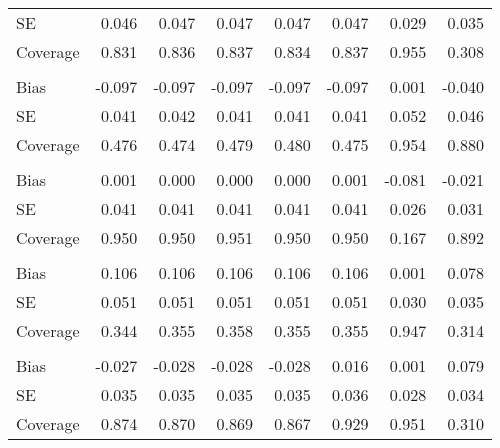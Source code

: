 \begin{table}
\begin{tabular}{lddddddd}
\hspace{1em}SE & 0.046 & 0.047 & 0.047 & 0.047 & 0.047 & 0.029 & 0.035\\
\hspace{1em}Coverage & 0.831 & 0.836 & 0.837 & 0.834 & 0.837 & 0.955 & 0.308\\
\addlinespace[0.3em]
\\
\hspace{1em}Bias & -0.097 & -0.097 & -0.097 & -0.097 & -0.097 & 0.001 & -0.040\\
\hspace{1em}SE & 0.041 & 0.042 & 0.041 & 0.041 & 0.041 & 0.052 & 0.046\\
\hspace{1em}Coverage & 0.476 & 0.474 & 0.479 & 0.480 & 0.475 & 0.954 & 0.880\\
\addlinespace[0.3em]
\\
\hspace{1em}Bias & 0.001 & 0.000 & 0.000 & 0.000 & 0.001 & -0.081 & -0.021\\
\hspace{1em}SE & 0.041 & 0.041 & 0.041 & 0.041 & 0.041 & 0.026 & 0.031\\
\hspace{1em}Coverage & 0.950 & 0.950 & 0.951 & 0.950 & 0.950 & 0.167 & 0.892\\
\addlinespace[0.3em]
\\
\hspace{1em}Bias & 0.106 & 0.106 & 0.106 & 0.106 & 0.106 & 0.001 & 0.078\\
\hspace{1em}SE & 0.051 & 0.051 & 0.051 & 0.051 & 0.051 & 0.030 & 0.035\\
\hspace{1em}Coverage & 0.344 & 0.355 & 0.358 & 0.355 & 0.355 & 0.947 & 0.314\\
\addlinespace[0.3em]
\\
\hspace{1em}Bias & -0.027 & -0.028 & -0.028 & -0.028 & 0.016 & 0.001 & 0.079\\
\hspace{1em}SE & 0.035 & 0.035 & 0.035 & 0.035 & 0.036 & 0.028 & 0.034\\
\hspace{1em}Coverage & 0.874 & 0.870 & 0.869 & 0.867 & 0.929 & 0.951 & 0.310\\

\end{tabular}
\end{table}
